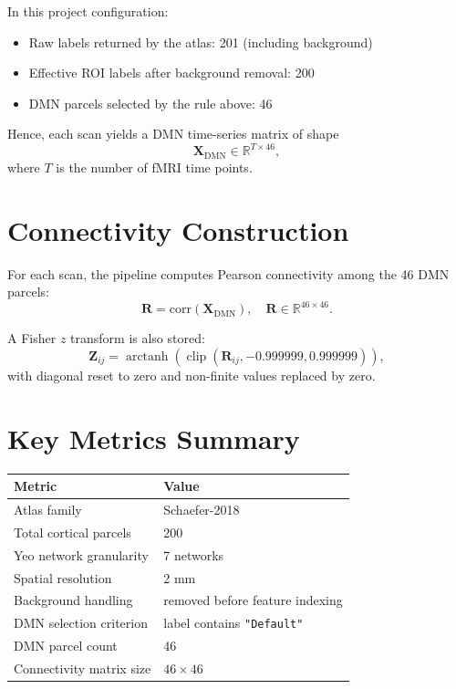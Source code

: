 \documentclass[11pt]{article}
\begin{document}
In this project configuration:
\begin{itemize}
\item Raw labels returned by the atlas: 201 (including background)
\item Effective ROI labels after background removal: 200
\item DMN parcels selected by the rule above: 46
\end{itemize}

Hence, each scan yields a DMN time-series matrix of shape
\begin{equation}
\mathbf{X}_{\text{DMN}} \in \mathbb{R}^{T \times 46},
\end{equation}
where $T$ is the number of fMRI time points.

\section*{Connectivity Construction}
For each scan, the pipeline computes Pearson connectivity among the 46 DMN parcels:
\begin{equation}
\mathbf{R} = \mathrm{corr}(\mathbf{X}_{\text{DMN}}), \quad \mathbf{R} \in \mathbb{R}^{46 \times 46}.
\end{equation}

A Fisher $z$ transform is also stored:
\begin{equation}
\mathbf{Z}_{ij} = \operatorname{arctanh}(\operatorname{clip}(\mathbf{R}_{ij}, -0.999999, 0.999999)),
\end{equation}
with diagonal reset to zero and non-finite values replaced by zero.

\section*{Key Metrics Summary}
\begin{table}[h]
\centering
\begin{tabular}{ll}
\toprule
Metric & Value \\
\midrule
Atlas family & Schaefer-2018 \\
Total cortical parcels & 200 \\
Yeo network granularity & 7 networks \\
Spatial resolution & 2 mm \\
Background handling & removed before feature indexing \\
DMN selection criterion & label contains \texttt{"Default"} \\
DMN parcel count & 46 \\
Connectivity matrix size & $46 \times 46$ \\
\bottomrule
\end{tabular}
\end{table}
\end{document}
